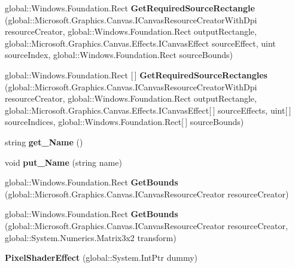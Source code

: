 \begin{DoxyCompactItemize}
global\+::\+Windows.\+Foundation.\+Rect {\bfseries Get\+Required\+Source\+Rectangle} (global\+::\+Microsoft.\+Graphics.\+Canvas.\+I\+Canvas\+Resource\+Creator\+With\+Dpi resource\+Creator, global\+::\+Windows.\+Foundation.\+Rect output\+Rectangle, global\+::\+Microsoft.\+Graphics.\+Canvas.\+Effects.\+I\+Canvas\+Effect source\+Effect, uint source\+Index, global\+::\+Windows.\+Foundation.\+Rect source\+Bounds)
\item 
\mbox{\label{class_microsoft_1_1_graphics_1_1_canvas_1_1_effects_1_1_pixel_shader_effect_a2f45a57c97ac1c2cbbe18733feef6852}} 
global\+::\+Windows.\+Foundation.\+Rect \mbox{[}$\,$\mbox{]} {\bfseries Get\+Required\+Source\+Rectangles} (global\+::\+Microsoft.\+Graphics.\+Canvas.\+I\+Canvas\+Resource\+Creator\+With\+Dpi resource\+Creator, global\+::\+Windows.\+Foundation.\+Rect output\+Rectangle, global\+::\+Microsoft.\+Graphics.\+Canvas.\+Effects.\+I\+Canvas\+Effect\mbox{[}$\,$\mbox{]} source\+Effects, uint\mbox{[}$\,$\mbox{]} source\+Indices, global\+::\+Windows.\+Foundation.\+Rect\mbox{[}$\,$\mbox{]} source\+Bounds)
\item 
\mbox{\label{class_microsoft_1_1_graphics_1_1_canvas_1_1_effects_1_1_pixel_shader_effect_aa32745e7c201b8eab234ad75c1731497}} 
string {\bfseries get\+\_\+\+Name} ()
\item 
\mbox{\label{class_microsoft_1_1_graphics_1_1_canvas_1_1_effects_1_1_pixel_shader_effect_a837510fd04b0fe1617fba8c9eddd7550}} 
void {\bfseries put\+\_\+\+Name} (string name)
\item 
\mbox{\label{class_microsoft_1_1_graphics_1_1_canvas_1_1_effects_1_1_pixel_shader_effect_a83c0b0a80d2d713d3c68d828d4c770b4}} 
global\+::\+Windows.\+Foundation.\+Rect {\bfseries Get\+Bounds} (global\+::\+Microsoft.\+Graphics.\+Canvas.\+I\+Canvas\+Resource\+Creator resource\+Creator)
\item 
\mbox{\label{class_microsoft_1_1_graphics_1_1_canvas_1_1_effects_1_1_pixel_shader_effect_aac3c63ff0d157bc6f13d8a2c0e7758a7}} 
global\+::\+Windows.\+Foundation.\+Rect {\bfseries Get\+Bounds} (global\+::\+Microsoft.\+Graphics.\+Canvas.\+I\+Canvas\+Resource\+Creator resource\+Creator, global\+::\+System.\+Numerics.\+Matrix3x2 transform)
\item 
\mbox{\label{class_microsoft_1_1_graphics_1_1_canvas_1_1_effects_1_1_pixel_shader_effect_a5f63570cf9a9453f0d96f88c1c811ec8}} 
{\bfseries Pixel\+Shader\+Effect} (global\+::\+System.\+Int\+Ptr dummy)
\end{DoxyCompactItemize}


